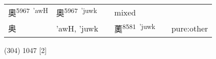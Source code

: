 \documentclass[14pt,a4paper]{scrartcl}
\begin{document}
\begin{longtable}[c]{@{}llllll@{}}
\begin{minipage}[t]{0.14\columnwidth}\raggedright\strut
奧\textsuperscript{5967~'awH}
\strut\end{minipage} &
\begin{minipage}[t]{0.14\columnwidth}\raggedright\strut
奧\textsuperscript{5967~'juwk}
\strut\end{minipage} &
\begin{minipage}[t]{0.14\columnwidth}\raggedright\strut
\strut\end{minipage} &
\begin{minipage}[t]{0.14\columnwidth}\raggedright\strut
mixed
\strut\end{minipage}\tabularnewline
\begin{minipage}[t]{0.14\columnwidth}\raggedright\strut
奥
\strut\end{minipage} &
\begin{minipage}[t]{0.14\columnwidth}\raggedright\strut
'awH, 'juwk
\strut\end{minipage} &
\begin{minipage}[t]{0.14\columnwidth}\raggedright\strut
\strut\end{minipage} &
\begin{minipage}[t]{0.14\columnwidth}\raggedright\strut
薁\textsuperscript{8581~'juwk}
\strut\end{minipage} &
\begin{minipage}[t]{0.14\columnwidth}\raggedright\strut
\strut\end{minipage} &
\begin{minipage}[t]{0.14\columnwidth}\raggedright\strut
pure:other
\strut\end{minipage}\tabularnewline
\bottomrule
\end{longtable}

(304) 1047 {[}2{]}
\end{document}

